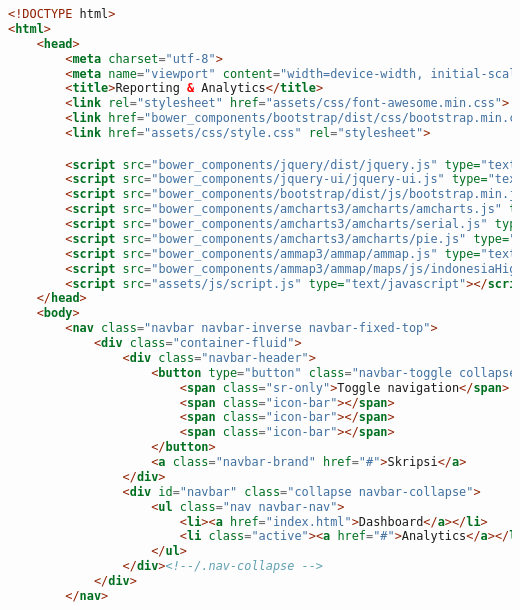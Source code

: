\begin{lstlisting}[language=HTML,basicstyle=\tiny,caption=reporting.html]
<!DOCTYPE html>
<html>
    <head>
        <meta charset="utf-8">
        <meta name="viewport" content="width=device-width, initial-scale=1">
        <title>Reporting & Analytics</title>
        <link rel="stylesheet" href="assets/css/font-awesome.min.css">
        <link href="bower_components/bootstrap/dist/css/bootstrap.min.css" rel="stylesheet">
        <link href="assets/css/style.css" rel="stylesheet">

        <script src="bower_components/jquery/dist/jquery.js" type="text/javascript"></script>
        <script src="bower_components/jquery-ui/jquery-ui.js" type="text/javascript"></script>
        <script src="bower_components/bootstrap/dist/js/bootstrap.min.js"></script>
        <script src="bower_components/amcharts3/amcharts/amcharts.js" type="text/javascript"></script>
        <script src="bower_components/amcharts3/amcharts/serial.js" type="text/javascript"></script>
        <script src="bower_components/amcharts3/amcharts/pie.js" type="text/javascript"></script>
        <script src="bower_components/ammap3/ammap/ammap.js" type="text/javascript"></script>
        <script src="bower_components/ammap3/ammap/maps/js/indonesiaHigh.js" type="text/javascript"></script>
        <script src="assets/js/script.js" type="text/javascript"></script>
    </head>
    <body>
        <nav class="navbar navbar-inverse navbar-fixed-top">
            <div class="container-fluid">
                <div class="navbar-header">
                    <button type="button" class="navbar-toggle collapsed" data-toggle="collapse" data-target="#navbar" aria-expanded="false" aria-controls="navbar">
                        <span class="sr-only">Toggle navigation</span>
                        <span class="icon-bar"></span>
                        <span class="icon-bar"></span>
                        <span class="icon-bar"></span>
                    </button>
                    <a class="navbar-brand" href="#">Skripsi</a>
                </div>
                <div id="navbar" class="collapse navbar-collapse">
                    <ul class="nav navbar-nav">
                        <li><a href="index.html">Dashboard</a></li>
                        <li class="active"><a href="#">Analytics</a></li>
                    </ul>
                </div><!--/.nav-collapse -->
            </div>
        </nav>


\end{lstlisting}
